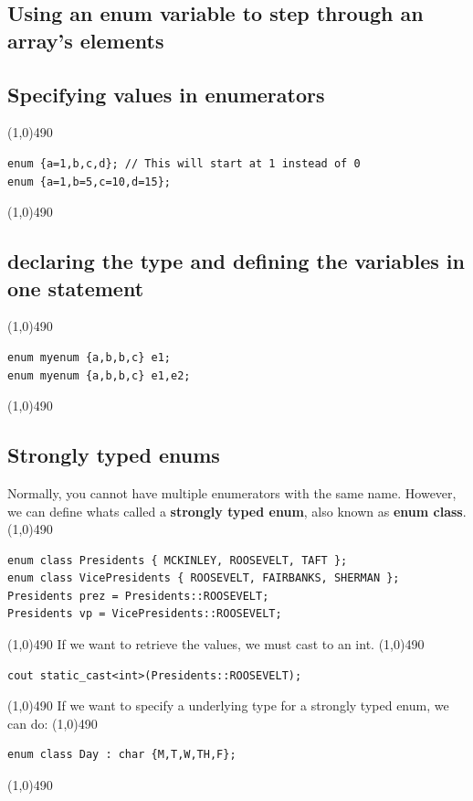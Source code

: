 \documentclass{report}
\begin{document}
    \bigbreak \noindent 
    \subsection{Using an enum variable to step through an array's elements}
    \bigbreak \noindent 

    \pagebreak \bigbreak \noindent 
    \subsection{Specifying values in enumerators}
    \bigbreak \noindent 
    \line(1,0){490}
    \begin{verbatim}
enum {a=1,b,c,d}; // This will start at 1 instead of 0
enum {a=1,b=5,c=10,d=15}; 
    \end{verbatim}
    \line(1,0){490}
    \bigbreak \noindent 
    \subsection{declaring the type and defining the variables in one statement}
    \bigbreak \noindent 
    \line(1,0){490}
    \begin{verbatim}
enum myenum {a,b,b,c} e1;
enum myenum {a,b,b,c} e1,e2;
    \end{verbatim}
    \line(1,0){490}

    \bigbreak \noindent 
    \subsection{Strongly typed enums}
    \bigbreak \noindent 
    Normally, you cannot have multiple enumerators with the same name. However, we can define whats called a \textbf{strongly typed enum}, also known as \textbf{enum class}.
    \bigbreak \noindent 
    \line(1,0){490}
    \begin{verbatim}
enum class Presidents { MCKINLEY, ROOSEVELT, TAFT }; 
enum class VicePresidents { ROOSEVELT, FAIRBANKS, SHERMAN };
Presidents prez = Presidents::ROOSEVELT;
Presidents vp = VicePresidents::ROOSEVELT;
    \end{verbatim}
    \line(1,0){490}
    \bigbreak \noindent 
    If we want to retrieve the values, we must cast to an int.
    \bigbreak \noindent 
    \line(1,0){490}
    \begin{verbatim}
cout static_cast<int>(Presidents::ROOSEVELT);
    \end{verbatim}
    \line(1,0){490}
    \bigbreak \noindent 
    If we want to specify a underlying type for a strongly typed enum, we can do:
    \bigbreak \noindent 
    \line(1,0){490}
    \begin{verbatim}
enum class Day : char {M,T,W,TH,F};
    \end{verbatim}
    \line(1,0){490}
\end{document}
